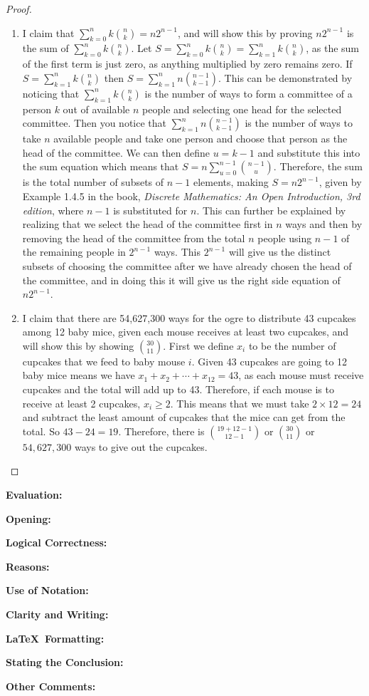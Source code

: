 \documentclass[11pt,titlepage]{article}		%
\def\rubric{\textbf{Evaluation:} \makebox[0.75in]{\hrulefill}

\vspace{.3in}

\textbf{Opening:} \makebox[0.75in]{\hrulefill}

\vspace{.3in}

\textbf{Logical Correctness:} \makebox[0.75in]{\hrulefill}

\vspace{.3in}

\textbf{Reasons:} \makebox[0.75in]{\hrulefill}

\vspace{.3in}

\textbf{Use of Notation:} \makebox[0.75in]{\hrulefill}

\vspace{.3in}

\textbf{Clarity and Writing:} \makebox[0.75in]{\hrulefill}

\vspace{.3in}

\textbf{\LaTeX\ Formatting:} \makebox[0.75in]{\hrulefill}

\vspace{.3in}

\textbf{Stating the Conclusion:} \makebox[0.75in]{\hrulefill}

\vspace{.3in}

\textbf{Other Comments:}

\vspace{1in}

}
\theoremstyle{definition}
\theoremstyle{theorem}
\begin{document}
\begin{proof}
\begin{enumerate}
    \item 
        I claim that $\sum\limits_{k=0}^n k \binom{n}{k} = n 2^{n-1}$, and will show this by proving $n 2^{n-1}$ is the sum of $\sum\limits_{k=0}^n k \binom{n}{k}$. Let $S=\sum\limits_{k=0}^n k \binom{n}{k} = \sum\limits_{k=1}^n k \binom{n}{k}$, as the sum of the first term is just zero, as anything multiplied by zero remains zero. If $S = \sum\limits_{k=1}^n k \binom{n}{k}$ then $S = \sum\limits_{k=1}^n n \binom{n-1}{k-1}$. 
        This can be demonstrated by noticing that $\sum\limits_{k=1}^n k \binom{n}{k}$ is the number of ways to form a committee of a person $k$ out of available $n$ people and selecting one head for the selected committee. 
        Then you notice that $\sum\limits_{k=1}^n n \binom{n-1}{k-1}$ is the number of ways to take $n$ available people and take one person and choose that person as the head of the committee. 
        We can then define $u = k-1$ and substitute this into the sum equation which means that $S = n\sum\limits_{u=0}^{n-1} \binom{n-1}{u}$.
        Therefore, the sum is the total number of subsets of $n-1$ elements, making $S = n 2^{n-1}$, given by Example 1.4.5 in the book, \textit{Discrete Mathematics: An Open Introduction, 3rd edition}, where $n-1$ is substituted for $n$.
        This can further be explained by realizing that we select the head of the committee first in $n$ ways and then by removing the head of the committee from the total $n$ people using $n-1$ of the remaining people in $2^{n-1}$ ways. This $2^{n-1}$ will give us the distinct subsets of choosing the committee after we have already chosen the head of the committee, and in doing this it will give us the right side equation of $n 2^{n-1}$.

    \item
        I claim that there are 54,627,300 ways for the ogre to distribute 43 cupcakes among 12 baby mice, given each mouse receives at least two cupcakes, and will show this by showing $\binom{30}{11}$. First we define $x_i$ to be the number of cupcakes that we feed to baby mouse $i$. Given 43 cupcakes are going to 12 baby mice means we have $x_1 + x_2 +\cdots + x_{12} = 43$, as each mouse must receive cupcakes and the total will add up to 43.
        Therefore, if each mouse is to receive at least 2 cupcakes, $x_i \ge 2$. This means that we must take $2\times12 = 24$ and subtract the least amount of cupcakes that the mice can get from the total. So $43 - 24 = 19$.
        Therefore, there is $\binom{19+12-1}{12-1}$ or $\binom{30}{11}$ or $54,627,300$ ways to give out the cupcakes.

\end{enumerate}
\end{proof}
\rubric
\end{document}
